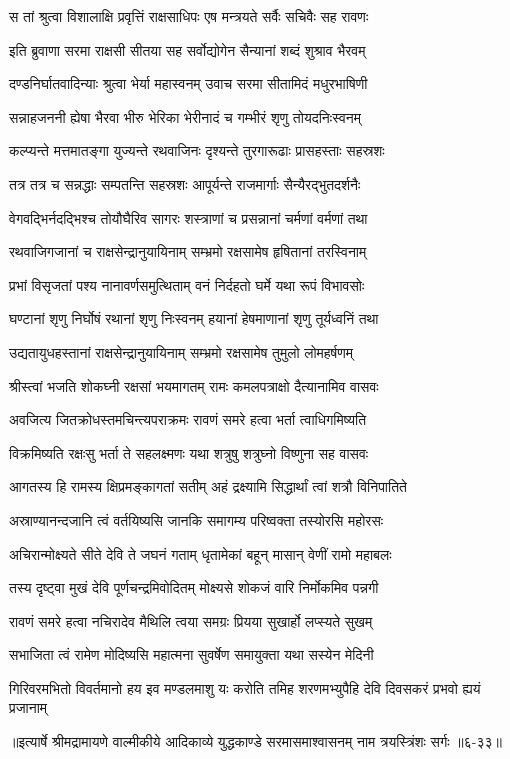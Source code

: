 \twolineshloka
{स तां श्रुत्वा विशालाक्षि प्रवृत्तिं राक्षसाधिपः}
{एष मन्त्रयते सर्वैः सचिवैः सह रावणः} %

\twolineshloka
{इति ब्रुवाणा सरमा राक्षसी सीतया सह}
{सर्वोद्योगेन सैन्यानां शब्दं शुश्राव भैरवम्} %

\twolineshloka
{दण्डनिर्घातवादिन्याः श्रुत्वा भेर्या महास्वनम्}
{उवाच सरमा सीतामिदं मधुरभाषिणी} %

\twolineshloka
{सन्नाहजननी ह्येषा भैरवा भीरु भेरिका}
{भेरीनादं च गम्भीरं शृणु तोयदनिःस्वनम्} %

\twolineshloka
{कल्प्यन्ते मत्तमातङ्गा युज्यन्ते रथवाजिनः}
{दृश्यन्ते तुरगारूढाः प्रासहस्ताः सहस्रशः} %

\twolineshloka
{तत्र तत्र च सन्नद्धाः सम्पतन्ति सहस्रशः}
{आपूर्यन्ते राजमार्गाः सैन्यैरद्भुतदर्शनैः} %

\twolineshloka
{वेगवद्भिर्नदद्भिश्च तोयौघैरिव सागरः}
{शस्त्राणां च प्रसन्नानां चर्मणां वर्मणां तथा} %

\twolineshloka
{रथवाजिगजानां च राक्षसेन्द्रानुयायिनाम्}
{सम्भ्रमो रक्षसामेष हृषितानां तरस्विनाम्} %

\twolineshloka
{प्रभां विसृजतां पश्य नानावर्णसमुत्थिताम्}
{वनं निर्दहतो घर्मे यथा रूपं विभावसोः} %

\twolineshloka
{घण्टानां शृणु निर्घोषं रथानां शृणु निःस्वनम्}
{हयानां हेषमाणानां शृणु तूर्यध्वनिं तथा} %

\twolineshloka
{उद्यतायुधहस्तानां राक्षसेन्द्रानुयायिनाम्}
{सम्भ्रमो रक्षसामेष तुमुलो लोमहर्षणम्} %

\twolineshloka
{श्रीस्त्वां भजति शोकघ्नी रक्षसां भयमागतम्}
{रामः कमलपत्राक्षो दैत्यानामिव वासवः} %

\twolineshloka
{अवजित्य जितक्रोधस्तमचिन्त्यपराक्रमः}
{रावणं समरे हत्वा भर्ता त्वाधिगमिष्यति} %

\twolineshloka
{विक्रमिष्यति रक्षःसु भर्ता ते सहलक्ष्मणः}
{यथा शत्रुषु शत्रुघ्नो विष्णुना सह वासवः} %

\twolineshloka
{आगतस्य हि रामस्य क्षिप्रमङ्कागतां सतीम्}
{अहं द्रक्ष्यामि सिद्धार्थां त्वां शत्रौ विनिपातिते} %

\twolineshloka
{अस्राण्यानन्दजानि त्वं वर्तयिष्यसि जानकि}
{समागम्य परिष्वक्ता तस्योरसि महोरसः} %

\twolineshloka
{अचिरान्मोक्ष्यते सीते देवि ते जघनं गताम्}
{धृतामेकां बहून् मासान् वेणीं रामो महाबलः} %

\twolineshloka
{तस्य दृष्ट्वा मुखं देवि पूर्णचन्द्रमिवोदितम्}
{मोक्ष्यसे शोकजं वारि निर्मोकमिव पन्नगी} %

\twolineshloka
{रावणं समरे हत्वा नचिरादेव मैथिलि}
{त्वया समग्रः प्रियया सुखार्हो लप्स्यते सुखम्} %

\twolineshloka
{सभाजिता त्वं रामेण मोदिष्यसि महात्मना}
{सुवर्षेण समायुक्ता यथा सस्येन मेदिनी} %

\twolineshloka
{गिरिवरमभितो विवर्तमानो हय इव मण्डलमाशु यः करोति}
{तमिह शरणमभ्युपैहि देवि दिवसकरं प्रभवो ह्ययं प्रजानाम्} %


॥इत्यार्षे श्रीमद्रामायणे वाल्मीकीये आदिकाव्ये युद्धकाण्डे सरमासमाश्वासनम् नाम त्रयस्त्रिंशः सर्गः ॥६-३३॥
